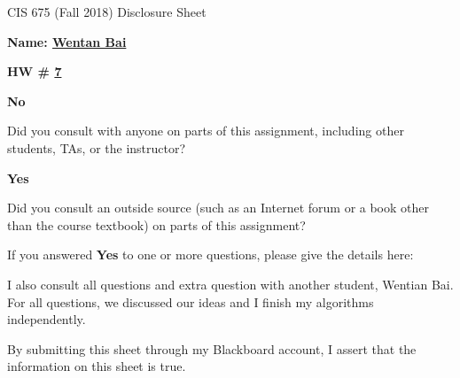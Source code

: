 \documentclass[12pt]{article}
\newcommand*\circled[1]{\tikz[baseline=(char.base)]{
            \node[shape=circle,draw,inner sep=2pt] (char) {#1};}}
\begin{document}
\begin{center}
  \Large
  CIS 675 (Fall 2018) Disclosure Sheet 
\end{center} 
\vspace*{2em}

\noindent
\textbf{\Large Name: \underline{ Wentan Bai }} 


\noindent 
\begin{minipage}[t]{1.0\linewidth}

\begin{minipage}[t]{0.25\linewidth}
\textbf{\Large
  HW \# \underline{ 7 }
} 

\end{minipage} \vspace*{3ex}




\begin{minipage}[t]{.8in}
  \textbf{\circled{Yes} \quad No}
\end{minipage}
\qquad 
\begin{minipage}[t]{5.5in}
  Did you consult with anyone on parts of this assignment, including other students, TAs, or the instructor? 
\end{minipage}
\vspace*{1ex}

\begin{minipage}[t]{.8in}
  \textbf{Yes \quad \circled{No}}
\end{minipage}
\qquad 
\begin{minipage}[t]{5.5in}
  Did you consult an outside source (such as an Internet forum or a
  book other than the course textbook) on parts of this assignment? 
\end{minipage}
\vspace*{1ex}

\noindent
  If you answered \textbf{Yes} to one or more questions, please give the details here: \vspace*{5ex} \par
  I also consult all questions and extra question with another student, Wentian Bai. For all questions, we discussed our ideas and I finish my algorithms independently. 


\vfill
\end{minipage}



\vspace*{40ex}

By submitting this sheet through my Blackboard account, I assert that the information on this sheet is true.
\end{document}

